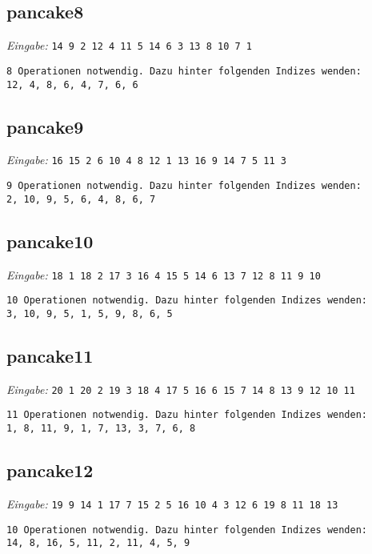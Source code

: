 \documentclass[a4paper, 10pt, ngerman]{article}
\begin{document}
\subsection*{pancake8}
\scriptsize \emph{Eingabe:} \verb|14 9 2 12 4 11 5 14 6 3 13 8 10 7 1|
\normalsize
\begin{lstlisting}
8 Operationen notwendig. Dazu hinter folgenden Indizes wenden:
12, 4, 8, 6, 4, 7, 6, 6
\end{lstlisting}

\subsection*{pancake9}
\scriptsize \emph{Eingabe:} \verb|16 15 2 6 10 4 8 12 1 13 16 9 14 7 5 11 3|
\normalsize
\begin{lstlisting}[numbers=none]
9 Operationen notwendig. Dazu hinter folgenden Indizes wenden:
2, 10, 9, 5, 6, 4, 8, 6, 7
\end{lstlisting}

\subsection*{pancake10}
\scriptsize \emph{Eingabe: }\verb|18 1 18 2 17 3 16 4 15 5 14 6 13 7 12 8 11 9 10|
\normalsize
\begin{lstlisting}[numbers=none]
10 Operationen notwendig. Dazu hinter folgenden Indizes wenden:
3, 10, 9, 5, 1, 5, 9, 8, 6, 5
\end{lstlisting}

\subsection*{pancake11}
\scriptsize \emph{Eingabe: }\verb|20 1 20 2 19 3 18 4 17 5 16 6 15 7 14 8 13 9 12 10 11|
\normalsize
\begin{lstlisting}[numbers=none]
11 Operationen notwendig. Dazu hinter folgenden Indizes wenden:
1, 8, 11, 9, 1, 7, 13, 3, 7, 6, 8
\end{lstlisting}

\subsection*{pancake12}
\scriptsize \emph{Eingabe: }\verb|19 9 14 1 17 7 15 2 5 16 10 4 3 12 6 19 8 11 18 13|
\normalsize
\begin{lstlisting}[numbers=none]
10 Operationen notwendig. Dazu hinter folgenden Indizes wenden:
14, 8, 16, 5, 11, 2, 11, 4, 5, 9
\end{lstlisting}
\end{document}
